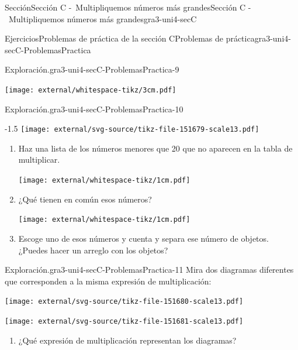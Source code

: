 \begin{sectionptx}{Sección}{Sección C -~Multipliquemos números más grandes}{}{Sección C -~Multipliquemos números más grandes}{}{}{gra3-uni4-secC}
\begin{exercises-subsection}{Ejercicios}{Problemas de práctica de la sección C}{}{Problemas de práctica}{}{}{gra3-uni4-secC-ProblemasPractica}
\begin{divisionexercise}{7}{Exploración.}{}{gra3-uni4-secC-ProblemasPractica-9}
\begin{enumerate}[label={(\alph*)}]
\begin{image}{0}{1}{0}{}%
\texttt{[image: external/whitespace-tikz/3cm.pdf]}
\end{image}%
\end{enumerate}
\end{divisionexercise}%
\begin{divisionexercise}{8}{Exploración.}{}{gra3-uni4-secC-ProblemasPractica-10}%
\begin{image}{0}{1}{0}{-1.5\baselineskip}%
\texttt{[image: external/svg-source/tikz-file-151679-scale13.pdf]}
\end{image}%
%
\begin{enumerate}[label={(\alph*)}]
\item{}Haz una lista de los números menores que 20 que no aparecen en la tabla de multiplicar.%
\begin{image}{0}{1}{0}{}%
\texttt{[image: external/whitespace-tikz/1cm.pdf]}
\end{image}%
\item{}¿Qué tienen en común esos números?%
\begin{image}{0}{1}{0}{}%
\texttt{[image: external/whitespace-tikz/1cm.pdf]}
\end{image}%
\item{}Escoge uno de esos números y cuenta y separa ese número de objetos. ¿Puedes hacer un arreglo con los objetos?%
\end{enumerate}
\end{divisionexercise}%
\begin{divisionexercise}{9}{Exploración.}{}{gra3-uni4-secC-ProblemasPractica-11}%
Mira dos diagramas diferentes que corresponden a la misma expresión de multiplicación:%
\begin{sidebyside}{2}{0.025}{0.025}{0.05}%
\begin{sbspanel}{0.45}%
\texttt{[image: external/svg-source/tikz-file-151680-scale13.pdf]}
\end{sbspanel}%
\begin{sbspanel}{0.45}%
\texttt{[image: external/svg-source/tikz-file-151681-scale13.pdf]}
\end{sbspanel}%
\end{sidebyside}%
%
\begin{enumerate}[label={(\alph*)}]
\item{}¿Qué expresión de multiplicación representan los diagramas?%

\end{enumerate}
\end{divisionexercise}
\end{exercises-subsection}
\end{sectionptx}
